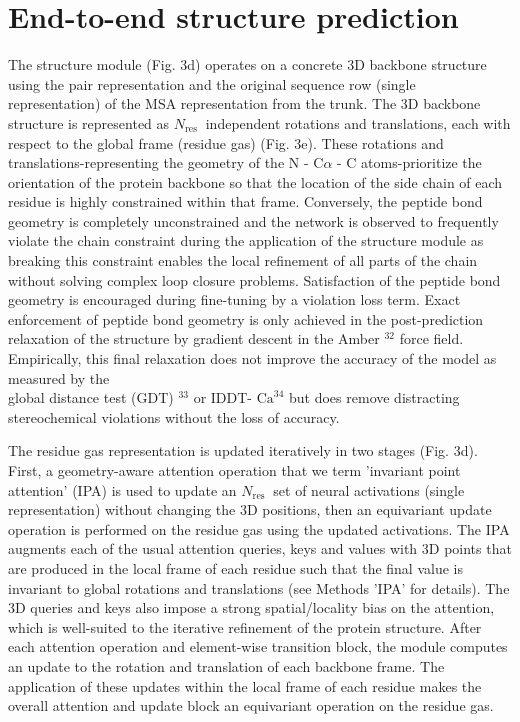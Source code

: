 \documentclass[10pt]{article}
\begin{document}
\section*{End-to-end structure prediction}
The structure module (Fig. 3d) operates on a concrete 3D backbone structure using the pair representation and the original sequence row (single representation) of the MSA representation from the trunk. The 3D backbone structure is represented as $N_{\text {res }}$ independent rotations and translations, each with respect to the global frame (residue gas) (Fig. 3e). These rotations and translations-representing the geometry of the N - $\mathrm{C} \alpha$ - C atoms-prioritize the orientation of the protein backbone so that the location of the side chain of each residue is highly constrained within that frame. Conversely, the peptide bond geometry is completely unconstrained and the network is observed to frequently violate the chain constraint during the application of the structure module as breaking this constraint enables the local refinement of all parts of the chain without solving complex loop closure problems. Satisfaction of the peptide bond geometry is encouraged during fine-tuning by a violation loss term. Exact enforcement of peptide bond geometry is only achieved in the post-prediction relaxation of the structure by gradient descent in the Amber ${ }^{32}$ force field. Empirically, this final relaxation does not improve the accuracy of the model as measured by the\\
global distance test (GDT) ${ }^{33}$ or IDDT- $\mathrm{Ca}^{34}$ but does remove distracting stereochemical violations without the loss of accuracy.

The residue gas representation is updated iteratively in two stages (Fig. 3d). First, a geometry-aware attention operation that we term 'invariant point attention' (IPA) is used to update an $N_{\text {res }}$ set of neural activations (single representation) without changing the 3D positions, then an equivariant update operation is performed on the residue gas using the updated activations. The IPA augments each of the usual attention queries, keys and values with 3D points that are produced in the local frame of each residue such that the final value is invariant to global rotations and translations (see Methods 'IPA' for details). The 3D queries and keys also impose a strong spatial/locality bias on the attention, which is well-suited to the iterative refinement of the protein structure. After each attention operation and element-wise transition block, the module computes an update to the rotation and translation of each backbone frame. The application of these updates within the local frame of each residue makes the overall attention and update block an equivariant operation on the residue gas.
\end{document}
